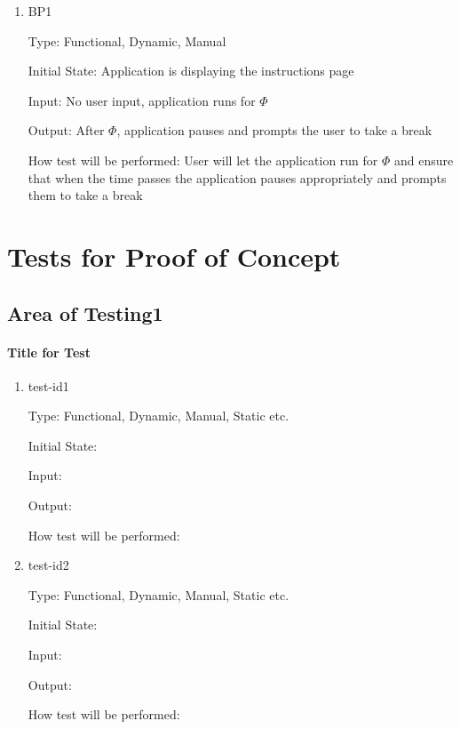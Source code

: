 \documentclass[12pt, titlepage]{article}
\begin{document}
\begin{enumerate}

\item{BP1\\}

Type: Functional, Dynamic, Manual
					
Initial State: Application is displaying the instructions page
					
Input: No user input, application runs for $\hyperref[tab:constants]{\Phi}$
					
Output: After $\hyperref[tab:constants]{\Phi}$, application pauses and prompts the user to take a break
					
How test will be performed: User will let the application run for $\hyperref[tab:constants]{\Phi}$ and ensure that when the time passes the application pauses appropriately and prompts them to take a break

\end{enumerate}

\section{Tests for Proof of Concept}

\subsection{Area of Testing1}
		
\paragraph{Title for Test}

\begin{enumerate}

\item{test-id1\\}

Type: Functional, Dynamic, Manual, Static etc.
					
Initial State: 
					
Input: 
					
Output: 
					
How test will be performed: 
					
\item{test-id2\\}

Type: Functional, Dynamic, Manual, Static etc.
					
Initial State: 
					
Input: 
					
Output: 
					
How test will be performed: 

\end{enumerate}
\end{document}
